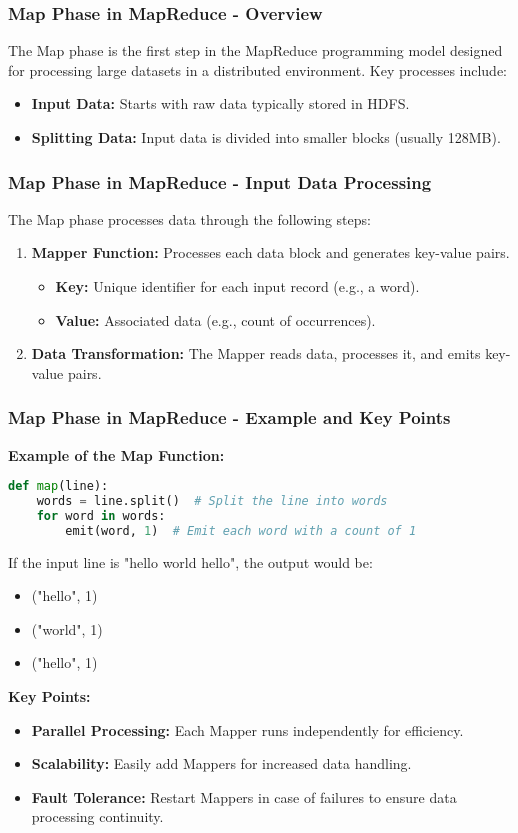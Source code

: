 \documentclass[aspectratio=169]{beamer}
\begin{document}
\begin{frame}[fragile]
  \frametitle{Map Phase in MapReduce - Overview}
  The Map phase is the first step in the MapReduce programming model designed for processing large datasets in a distributed environment. Key processes include:
  \begin{itemize}
    \item \textbf{Input Data:} Starts with raw data typically stored in HDFS.
    \item \textbf{Splitting Data:} Input data is divided into smaller blocks (usually 128MB).
  \end{itemize}
\end{frame}

\begin{frame}[fragile]
  \frametitle{Map Phase in MapReduce - Input Data Processing}
  The Map phase processes data through the following steps:
  \begin{enumerate}
    \item \textbf{Mapper Function:} Processes each data block and generates key-value pairs.
      \begin{itemize}
        \item \textbf{Key:} Unique identifier for each input record (e.g., a word).
        \item \textbf{Value:} Associated data (e.g., count of occurrences).
      \end{itemize}
    \item \textbf{Data Transformation:} The Mapper reads data, processes it, and emits key-value pairs.
  \end{enumerate}
\end{frame}

\begin{frame}[fragile]
  \frametitle{Map Phase in MapReduce - Example and Key Points}
  \textbf{Example of the Map Function:}
  \begin{lstlisting}[language=Python]
def map(line):
    words = line.split()  # Split the line into words
    for word in words:
        emit(word, 1)  # Emit each word with a count of 1
  \end{lstlisting}
  If the input line is "hello world hello", the output would be:
  \begin{itemize}
    \item ("hello", 1)
    \item ("world", 1)
    \item ("hello", 1)
  \end{itemize}
  \textbf{Key Points:}
  \begin{itemize}
    \item \textbf{Parallel Processing:} Each Mapper runs independently for efficiency.
    \item \textbf{Scalability:} Easily add Mappers for increased data handling.
    \item \textbf{Fault Tolerance:} Restart Mappers in case of failures to ensure data processing continuity.
  \end{itemize}
\end{frame}
\end{document}
